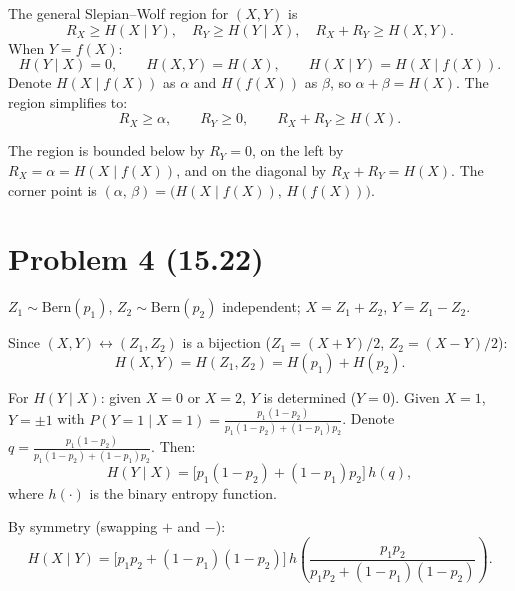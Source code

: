 \documentclass[11pt,a4paper]{article}
\begin{document}
The general Slepian--Wolf region for $(X,Y)$ is
\[
R_X \ge H(X\mid Y),\quad
R_Y \ge H(Y\mid X),\quad
R_X+R_Y \ge H(X,Y).
\]
When $Y=f(X)$:
\[
H(Y\mid X)=0,\qquad H(X,Y)=H(X),\qquad H(X\mid Y)=H(X\mid f(X)).
\]
Denote $H(X\mid f(X))$ as $\alpha$ and $H(f(X))$ as $\beta$, so $\alpha+\beta=H(X)$.
The region simplifies to:
\[
  R_X \ge \alpha,\qquad R_Y \ge 0,\qquad R_X+R_Y\ge H(X).
\]

\begin{center}
\end{center}

The region is bounded below by $R_Y=0$, on the left by $R_X=\alpha=H(X\mid f(X))$,
and on the diagonal by $R_X+R_Y=H(X)$.
The corner point is $(\alpha,\,\beta)=\bigl(H(X\mid f(X)),\,H(f(X))\bigr)$.

\section*{Problem 4 \normalfont\small(15.22)}

$Z_1\sim\mathrm{Bern}(p_1)$, $Z_2\sim\mathrm{Bern}(p_2)$ independent;
$X=Z_1+Z_2$, $Y=Z_1-Z_2$.

Since $(X,Y)\leftrightarrow(Z_1,Z_2)$ is a bijection
($Z_1=(X{+}Y)/2$, $Z_2=(X{-}Y)/2$):
\[
  H(X,Y) = H(Z_1,Z_2) = H(p_1)+H(p_2).
\]

For $H(Y\mid X)$: given $X{=}0$ or $X{=}2$, $Y$ is determined ($Y=0$).
Given $X{=}1$, $Y=\pm 1$ with $P(Y{=}1\mid X{=}1)=\frac{p_1(1-p_2)}{p_1(1-p_2)+(1-p_1)p_2}$.
Denote $q=\frac{p_1(1-p_2)}{p_1(1-p_2)+(1-p_1)p_2}$.  Then:
\[
  H(Y\mid X) = \bigl[p_1(1-p_2)+(1-p_1)p_2\bigr]\,h(q),
\]
where $h(\cdot)$ is the binary entropy function.

By symmetry (swapping $+$ and $-$):
\[
  H(X\mid Y) = \bigl[p_1 p_2+(1-p_1)(1-p_2)\bigr]\,h\!\left(\frac{p_1 p_2}{p_1 p_2+(1-p_1)(1-p_2)}\right).
\]
\end{document}
